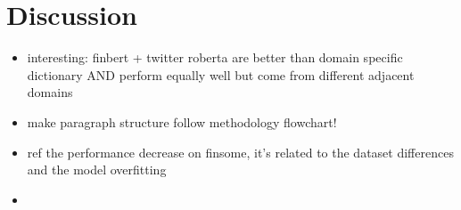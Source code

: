 \section{Discussion}

\begin{itemize}[noitemsep]
	\item interesting: finbert + twitter roberta are better than domain specific dictionary AND perform equally well but come from different adjacent domains
	\item make paragraph structure follow methodology flowchart!
	\item ref the performance decrease on finsome, it's related to the dataset differences and the model overfitting
	\item 
\end{itemize}
